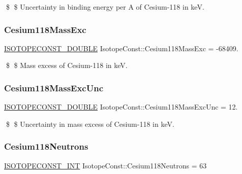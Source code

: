 \$ \$ Uncertainty in binding energy per A of Cesium-\/118 in keV. \mbox{\label{group___isotope_const-_cesium-_cs118_ga6060957cc6eac42d454327f6be6c5465}} 
\subsubsection{\texorpdfstring{Cesium118\+Mass\+Exc}{Cesium118MassExc}}
{\footnotesize\ttfamily \mbox{\hyperlink{group___isotope_const-_macros_ga8f45a7272ce02c0b4c65c44636ed719a}{I\+S\+O\+T\+O\+P\+E\+C\+O\+N\+S\+T\+\_\+\+D\+O\+U\+B\+LE}} Isotope\+Const\+::\+Cesium118\+Mass\+Exc = -\/68409.}

\$ \$ Mass excess of Cesium-\/118 in keV. \mbox{\label{group___isotope_const-_cesium-_cs118_ga632e5549a52368dc7aaab790df073091}} 
\subsubsection{\texorpdfstring{Cesium118\+Mass\+Exc\+Unc}{Cesium118MassExcUnc}}
{\footnotesize\ttfamily \mbox{\hyperlink{group___isotope_const-_macros_ga8f45a7272ce02c0b4c65c44636ed719a}{I\+S\+O\+T\+O\+P\+E\+C\+O\+N\+S\+T\+\_\+\+D\+O\+U\+B\+LE}} Isotope\+Const\+::\+Cesium118\+Mass\+Exc\+Unc = 12.}

\$ \$ Uncertainty in mass excess of Cesium-\/118 in keV. \mbox{\label{group___isotope_const-_cesium-_cs118_gae2dee11c6df659f78da0e50a22880ace}} 
\subsubsection{\texorpdfstring{Cesium118\+Neutrons}{Cesium118Neutrons}}
{\footnotesize\ttfamily \mbox{\hyperlink{group___isotope_const-_macros_ga5f18360b3e99483a35c32d789e62621c}{I\+S\+O\+T\+O\+P\+E\+C\+O\+N\+S\+T\+\_\+\+I\+NT}} Isotope\+Const\+::\+Cesium118\+Neutrons = 63}

